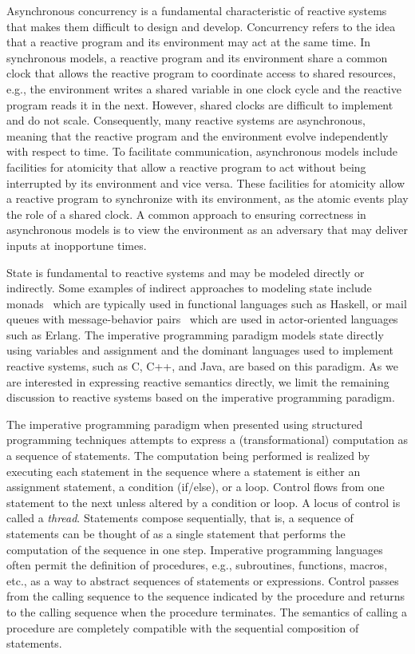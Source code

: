 Asynchronous concurrency is a fundamental characteristic of reactive systems that makes them difficult to design and develop.
Concurrency refers to the idea that a reactive program and its environment may act at the same time.
In synchronous models, a reactive program and its environment share a common clock that allows the reactive program to coordinate access to shared resources, e.g., the environment writes a shared variable in one clock cycle and the reactive program reads it in the next.
However, shared clocks are difficult to implement and do not scale.
Consequently, many reactive systems are asynchronous, meaning that the reactive program and the environment evolve independently with respect to time.
To facilitate communication, asynchronous models include facilities for atomicity that allow a reactive program to act without being interrupted by its environment and vice versa.
These facilities for atomicity allow a reactive program to synchronize with its environment, as the atomic events play the role of a shared clock.
A common approach to ensuring correctness in asynchronous models is to view the environment as an adversary that may deliver inputs at inopportune times.

State is fundamental to reactive systems and may be modeled directly or indirectly.
Some examples of indirect approaches to modeling state include monads~\cite{wadler1990comprehending} which are typically used in functional languages such as Haskell, or mail queues with message-behavior pairs~\cite{agha1985actors} which are used in actor-oriented languages such as Erlang.
The imperative programming paradigm models state directly using variables and assignment and the dominant languages used to implement reactive systems, such as C, C++, and Java, are based on this paradigm.
As we are interested in expressing reactive semantics directly, we limit the remaining discussion to reactive systems based on the imperative programming paradigm.

The imperative programming paradigm when presented using structured programming techniques attempts to express a (transformational) computation as a sequence of statements.
The computation being performed is realized by executing each statement in the sequence where a statement is either an assignment statement, a condition (if/else), or a loop.
Control flows from one statement to the next unless altered by a condition or loop.
A locus of control is called a \emph{thread}.
Statements compose sequentially, that is, a sequence of statements can be thought of as a single statement that performs the computation of the sequence in one step.
Imperative programming languages often permit the definition of procedures, e.g., subroutines, functions, macros, etc., as a way to abstract sequences of statements or expressions.
Control passes from the calling sequence to the sequence indicated by the procedure and returns to the calling sequence when the procedure terminates.
The semantics of calling a procedure are completely compatible with the sequential composition of statements.

